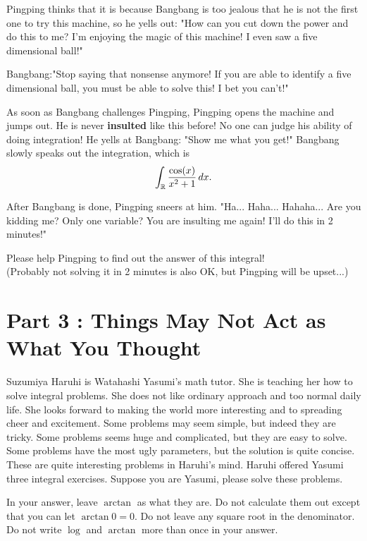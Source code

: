 \documentclass[12pt]{article}
\begin{document}
\par Pingping thinks that it is because Bangbang is too jealous that he is not the first one to try this machine, so he
yells out: "How can you cut down the power and do this to me? I'm enjoying the magic of this machine! I even 
saw a five dimensional ball!"

\par Bangbang:"Stop saying that nonsense anymore! If you are able to identify a five dimensional ball, you must be able to
solve this! I bet you can't!"

\par As soon as Bangbang challenges Pingping, Pingping opens the machine and jumps out. He is never \textbf{insulted} like 
this before! No one can judge his ability of doing integration! He yells at Bangbang: "Show me what you get!" 
Bangbang slowly speaks out the integration, which is
\begin{equation*}
    \int_{\mathbb{R}} \frac{\cos (x)}{x^2+1}\,dx. 
\end{equation*}

\par After Bangbang is done, Pingping sneers at him. "Ha... Haha... Hahaha... Are you kidding me? Only one variable? 
You are insulting me again! I'll do this in 2 minutes!"

\par Please help Pingping to find out the answer of this integral!\\

\hfill (Probably not solving it in 2 minutes is also OK, but Pingping will be upset...)
\newpage
\section*{Part 3 : Things May Not Act as What You Thought}

Suzumiya Haruhi is Watahashi Yasumi's math tutor. She is teaching her how to solve integral problems. She does not like ordinary approach and too normal daily life. She looks forward to making the world more interesting and to spreading cheer and excitement. Some problems may seem simple, but indeed they are tricky. Some problems seems huge and complicated, but they are easy to solve. Some problems have the most ugly parameters, but the solution is quite concise. These are quite interesting problems in Haruhi's mind. Haruhi offered Yasumi three integral exercises. Suppose you are Yasumi, please solve these problems.
\par In your answer, leave $\arctan$ as what they are. Do not calculate them out except that you can let $\arctan 0 = 0$. Do not leave any square root in the denominator. Do not write $\log$ and $\arctan$ more than once in your answer.
\end{document}
